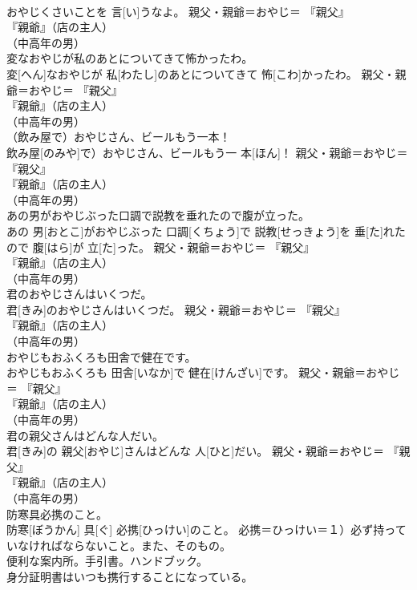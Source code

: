\documentclass[8pt]{extreport}
\begin{document}
\begin{CJK}{UTF8}{min}
{\\	おやじくさいことを 言[い]うなよ。	親父・親爺＝おやじ＝ 『親父』
\\	『親爺』（店の主人）
\\	（中高年の男）
\\	変なおやじが私のあとについてきて怖かったわ。	
\\	変[へん]なおやじが 私[わたし]のあとについてきて 怖[こわ]かったわ。	親父・親爺＝おやじ＝ 『親父』
\\	『親爺』（店の主人）
\\	（中高年の男）
\\	（飲み屋で）おやじさん、ビールもう一本！	
\\	飲み屋[のみや]で）おやじさん、ビールもう一 本[ほん]！	親父・親爺＝おやじ＝ 『親父』
\\	『親爺』（店の主人）
\\	（中高年の男）
\\	あの男がおやじぶった口調で説教を垂れたので腹が立った。	
\\	あの 男[おとこ]がおやじぶった 口調[くちょう]で 説教[せっきょう]を 垂[た]れたので 腹[はら]が 立[た]った。	親父・親爺＝おやじ＝ 『親父』
\\	『親爺』（店の主人）
\\	（中高年の男）
\\	君のおやじさんはいくつだ。	
\\	君[きみ]のおやじさんはいくつだ。	親父・親爺＝おやじ＝ 『親父』
\\	『親爺』（店の主人）
\\	（中高年の男）
\\	おやじもおふくろも田舎で健在です。	
\\	おやじもおふくろも 田舎[いなか]で 健在[けんざい]です。	親父・親爺＝おやじ＝ 『親父』
\\	『親爺』（店の主人）
\\	（中高年の男）
\\	君の親父さんはどんな人だい。	
\\	君[きみ]の 親父[おやじ]さんはどんな 人[ひと]だい。	親父・親爺＝おやじ＝ 『親父』
\\	『親爺』（店の主人）
\\	（中高年の男）
\\	防寒具必携のこと。	
\\	防寒[ぼうかん] 具[ぐ] 必携[ひっけい]のこと。	必携＝ひっけい＝１）必ず持っていなければならないこと。また、そのもの。 　　　　　　　　
\\	便利な案内所。手引書。ハンドブック。
\\	身分証明書はいつも携行することになっている。	
}
\end{CJK}
\end{document}
